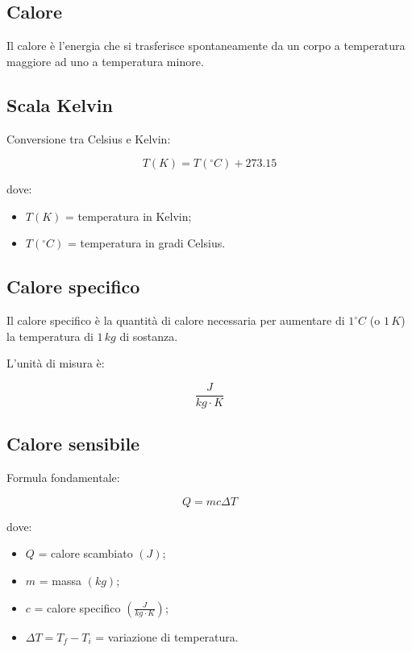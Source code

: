 \subsection{Calore}

Il calore è l'energia che si trasferisce spontaneamente da un corpo a temperatura maggiore ad uno a temperatura minore.

\subsection{Scala Kelvin}

Conversione tra Celsius e Kelvin:

\[
T(K)=T(^{\circ}C)+273.15
\]

\noindent dove:

\begin{itemize}
    \item $T(K)$ = temperatura in Kelvin;
    \item $T(^{\circ}C)$ = temperatura in gradi Celsius.
\end{itemize}

\subsection{Calore specifico}

Il calore specifico è la quantità di calore necessaria per aumentare di $1^\circ C$ (o $1\,K$) la temperatura di $1\,kg$ di sostanza.

\noindent L'unità di misura è:

\[
\frac{J}{kg\cdot K}
\]

\vspace{0.3cm}

\subsection{Calore sensibile}

Formula fondamentale:

\[
Q=mc\Delta T
\]

\noindent dove:

\begin{itemize}
    \item $Q$ = calore scambiato $(J)$;
    \item $m$ = massa $(kg)$;
    \item $c$ = calore specifico $\left(\frac{J}{kg\cdot K}\right)$;
    \item $\Delta T=T_f-T_i$ = variazione di temperatura.
\end{itemize}

